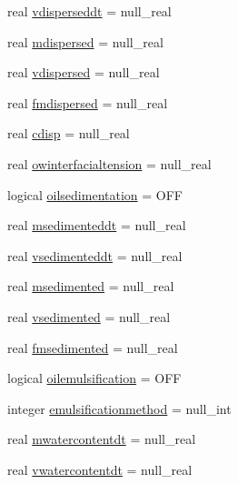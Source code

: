 \begin{DoxyCompactItemize}
\item 
real \mbox{\hyperlink{structmoduleoil__0d_1_1t__var_a20bbe9b8323ef56128909179928c45d7}{vdisperseddt}} = null\+\_\+real
\item 
real \mbox{\hyperlink{structmoduleoil__0d_1_1t__var_a9bf47bcb21b58dd3896eb4686eabbfb9}{mdispersed}} = null\+\_\+real
\item 
real \mbox{\hyperlink{structmoduleoil__0d_1_1t__var_ac6fe07d219c0f0a5b943cb606fd874a9}{vdispersed}} = null\+\_\+real
\item 
real \mbox{\hyperlink{structmoduleoil__0d_1_1t__var_ab623ca6cf39d93f2a0eb26b2af236ffd}{fmdispersed}} = null\+\_\+real
\item 
real \mbox{\hyperlink{structmoduleoil__0d_1_1t__var_ab1b61639dae0e486bcac04266facbb6d}{cdisp}} = null\+\_\+real
\item 
real \mbox{\hyperlink{structmoduleoil__0d_1_1t__var_a97e9c11bb8e2c14a013f371d104011cb}{owinterfacialtension}} = null\+\_\+real
\item 
logical \mbox{\hyperlink{structmoduleoil__0d_1_1t__var_ac7c95690db279c61b3c3ec03f903ce51}{oilsedimentation}} = O\+FF
\item 
real \mbox{\hyperlink{structmoduleoil__0d_1_1t__var_af0654b2c87a21800dfc69762a4a5e25b}{msedimenteddt}} = null\+\_\+real
\item 
real \mbox{\hyperlink{structmoduleoil__0d_1_1t__var_afa7008095a31453e375406e70ee84e89}{vsedimenteddt}} = null\+\_\+real
\item 
real \mbox{\hyperlink{structmoduleoil__0d_1_1t__var_a6d987df9f25113cf0a083eed5d002950}{msedimented}} = null\+\_\+real
\item 
real \mbox{\hyperlink{structmoduleoil__0d_1_1t__var_a5879a51e13cd8d86c7fcb075a70069cb}{vsedimented}} = null\+\_\+real
\item 
real \mbox{\hyperlink{structmoduleoil__0d_1_1t__var_af17de2b24c766f52733ef66fc03afe1b}{fmsedimented}} = null\+\_\+real
\item 
logical \mbox{\hyperlink{structmoduleoil__0d_1_1t__var_a8fb781dedbdecc7a634c542c7d388633}{oilemulsification}} = O\+FF
\item 
integer \mbox{\hyperlink{structmoduleoil__0d_1_1t__var_a5af60c1c6b98643e66863c22882fd921}{emulsificationmethod}} = null\+\_\+int
\item 
real \mbox{\hyperlink{structmoduleoil__0d_1_1t__var_a05d870d598a2ea4e0cf826a1d48e1493}{mwatercontentdt}} = null\+\_\+real
\item 
real \mbox{\hyperlink{structmoduleoil__0d_1_1t__var_a54d02626d0ec833ebc56aea76bfa2cc3}{vwatercontentdt}} = null\+\_\+real

\end{DoxyCompactItemize}
